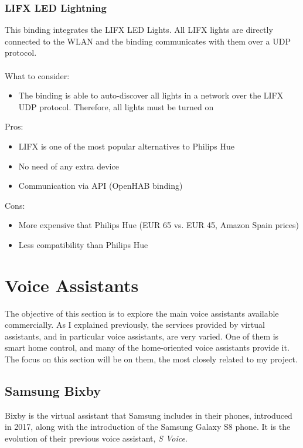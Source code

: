 \subsubsection{LIFX LED Lightning}
This binding integrates the LIFX LED Lights. All LIFX lights are directly connected to the WLAN and the binding communicates with
them over a UDP protocol.\\~\\
What to consider:
\begin{itemize}
	\item The binding is able to auto-discover all lights in a network over the LIFX UDP protocol. Therefore, all lights must be turned on
\end{itemize}
Pros:
\begin{itemize}
	\item LIFX is one of the most popular alternatives to Philips Hue
	\item No need of any extra device
	\item Communication via API (OpenHAB binding)
\end{itemize}
Cons:
\begin{itemize}
	\item More expensive that Philips Hue (EUR 65 vs. EUR 45, Amazon Spain prices)
	\item Less compatibility than Philips Hue
\end{itemize}


%
%
%
%
%
%
%
%
%
%
%
%
%

\section{Voice Assistants}
The objective of this section is to explore the main voice assistants available commercially. As I explained previously, the services
provided by virtual assistants, and in particular voice assistants, are very varied. One of them is smart home control, and many of
the home-oriented voice assistants provide it. The focus on this section will be on them, the most closely related to my project.

\subsection{Samsung Bixby}
Bixby is the virtual assistant that Samsung includes in their phones, introduced in 2017, along with the introduction of the Samsung 
Galaxy S8 phone. It is the evolution of their previous voice assistant, \textit{S Voice}.

